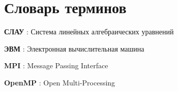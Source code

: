 \chapter*{Словарь терминов}             %

\textbf{СЛАУ} : Система линейных алгебраических уравнений

\textbf{ЭВМ} : Электронная вычислительная машина

\textbf{MPI} : Message Passing Interface

\textbf{OpenMP} : Open Multi-Processing